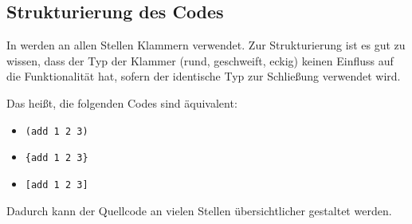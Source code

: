\subsection{Strukturierung des Codes}
	In \racketText werden an allen Stellen Klammern verwendet. Zur Strukturierung ist es gut zu wissen, dass der Typ der Klammer (rund, geschweift, eckig) keinen Einfluss auf die Funktionalität hat, sofern der identische Typ zur Schließung verwendet wird.
	
	Das heißt, die folgenden Codes sind äquivalent:
	\begin{itemize}
		\item \lstinline[language = Racket]|(add 1 2 3)|
		\item \lstinline[language = Racket]|{add 1 2 3}|
		\item \lstinline[language = Racket]|[add 1 2 3]|
	\end{itemize}

	Dadurch kann der Quellcode an vielen Stellen übersichtlicher gestaltet werden.
